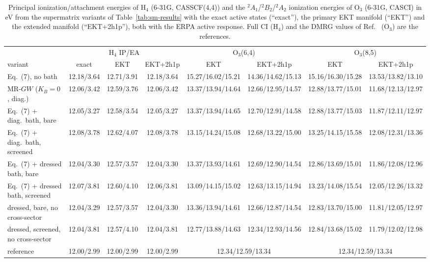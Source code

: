\documentclass[aip,jcp,reprint,noshowkeys,superscriptaddress]{revtex4-1}
\begin{document}
\begin{table}[t]
\caption{Principal ionization/attachment energies of H$_4$ (6-31G,
CASSCF(4,4)) and the $^2A_1$/$^2B_2$/$^2A_2$ ionization energies of O$_3$
(6-31G, CASCI) in eV from the supermatrix variants of
Table~\ref{tab:sm-results} with the exact active states (``exact''), the
primary EKT manifold (``EKT'') and the extended manifold (``EKT+2h1p''),
both with the ERPA active response.  Full CI (H$_4$) and the DMRG values of
Ref.~\cite{WangFangLi2026} (O$_3$) are the references.}
\label{tab:ekt-results}
\begin{ruledtabular}
\begin{tabular}{lccccccc}
 & \multicolumn{3}{c}{H$_4$ IP/EA} & \multicolumn{2}{c}{O$_3$(6,4)} & \multicolumn{2}{c}{O$_3$(8,5)} \\
variant & exact & EKT & EKT+2h1p & EKT & EKT+2h1p & EKT & EKT+2h1p \\
\hline
Eq.~(7), no bath & 12.18/3.64 & 12.71/3.91 & 12.18/3.64 & 15.27/16.02/15.21 & 14.36/14.62/15.13 & 15.16/16.30/15.28 & 13.53/13.82/13.10 \\
MR-$GW$ ($K_B=0$, diag.) & 12.06/3.42 & 12.59/3.76 & 12.06/3.42 & 13.37/13.94/14.64 & 12.66/12.95/14.57 & 12.88/13.77/15.01 & 11.68/12.13/12.97 \\
Eq.~(7) + diag.\ bath, bare & 12.05/3.27 & 12.58/3.54 & 12.05/3.27 & 13.37/13.94/14.65 & 12.70/12.91/14.58 & 12.88/13.77/15.03 & 11.87/12.11/12.97 \\
Eq.~(7) + diag.\ bath, screened & 12.08/3.78 & 12.62/4.07 & 12.08/3.78 & 13.15/14.24/15.08 & 12.68/13.22/15.00 & 13.25/14.15/15.58 & 12.08/12.31/13.36 \\
Eq.~(7) + dressed bath, bare & 12.04/3.30 & 12.57/3.57 & 12.04/3.30 & 13.37/13.93/14.61 & 12.69/12.90/14.54 & 12.86/13.69/15.01 & 11.86/12.08/12.96 \\
Eq.~(7) + dressed bath, screened & 12.07/3.81 & 12.60/4.10 & 12.06/3.81 & 13.09/14.15/15.02 & 12.63/13.15/14.94 & 13.23/14.08/15.54 & 12.05/12.26/13.32 \\
dressed, bare, no cross-sector & 12.04/3.29 & 12.57/3.57 & 12.04/3.30 & 13.36/13.94/14.61 & 12.66/12.87/14.54 & 12.83/13.70/15.00 & 11.81/12.05/12.97 \\
dressed, screened, no cross-sector & 12.04/3.81 & 12.57/4.10 & 12.04/3.81 & 12.77/13.88/14.63 & 12.34/12.93/14.56 & 12.84/13.68/15.02 & 11.79/12.02/12.98 \\
reference & 12.00/2.99 & 12.00/2.99 & 12.00/2.99 & \multicolumn{2}{c}{12.34/12.59/13.34} & \multicolumn{2}{c}{12.34/12.59/13.34} \\
\end{tabular}
\end{ruledtabular}
\end{table}
\end{document}
